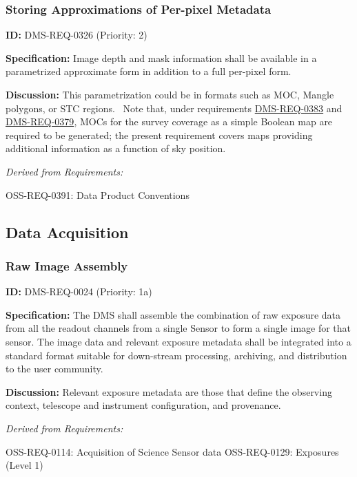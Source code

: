 \documentclass[SE,toc,lsstdraft]{lsstdoc}
\begin{document}
\subsubsection{Storing Approximations of Per-pixel Metadata}

\label{DMS-REQ-0326}
\textbf{ID:} DMS-REQ-0326 (Priority: 2)

\textbf{Specification:}
    Image depth and mask information shall be available in a parametrized approximate form in addition to a full per-pixel form.

\textbf{Discussion:}
    This parametrization could be in formats such as MOC, Mangle polygons, or STC regions.  Note that, under requirements \hyperref[DMS-REQ-0383]{DMS-REQ-0383} and \hyperref[DMS-REQ-0379]{DMS-REQ-0379}, MOCs for the survey coverage as a simple Boolean map are required to be generated; the present requirement covers maps providing additional information as a function of sky position.

\emph{Derived from Requirements:}

OSS-REQ-0391:
Data Product Conventions \newline

\subsection{Data Acquisition}

\subsubsection{Raw Image Assembly}

\label{DMS-REQ-0024}
\textbf{ID:} DMS-REQ-0024 (Priority: 1a)

\textbf{Specification:} The DMS shall assemble the combination of raw exposure data from all the readout channels from a single Sensor to form a single image for that sensor. The image data and relevant exposure metadata shall be integrated into a standard format suitable for down-stream processing, archiving, and distribution to the user community.

\textbf{Discussion:} Relevant exposure metadata are those that define the observing context, telescope and instrument configuration, and provenance.

\emph{Derived from Requirements:}

OSS-REQ-0114:
Acquisition of Science Sensor data \newline
OSS-REQ-0129:
Exposures (Level 1) \newline
\end{document}
